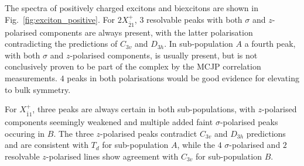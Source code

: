 The spectra of positively charged excitons and biexcitons are shown in Fig.~\ref{fig:exciton_positive}. For $2X^+_{\bar{2}1}$, 3 resolvable peaks with both $\sigma$ and $z$-polarised components are always present, with the latter polarisation contradicting the predictions of $C_{3v}$ and $D_{3h}$. In sub-population $A$ a fourth peak, with both $\sigma$ and $z$-polarised components, is usually present, but is not conclusively proven to be part of the complex by the MCJP correlation measurements. $4$ peaks in both polarisations would be good evidence for elevating to bulk symmetry.

For $X^+_{\bar{1}1}$, three peaks are always certain in both sub-populations, with $z$-polarised components seemingly weakened and multiple added faint $\sigma$-polarised peaks occuring in $B$. The three $z$-polarised peaks contradict $C_{3v}$ and $D_{3h}$ predictions and are consistent with $T_d$ for sub-population $A$, while the $4$ $\sigma$-polarised and $2$ resolvable $z$-polarised lines show agreement with $C_{3v}$ for sub-population $B$.

